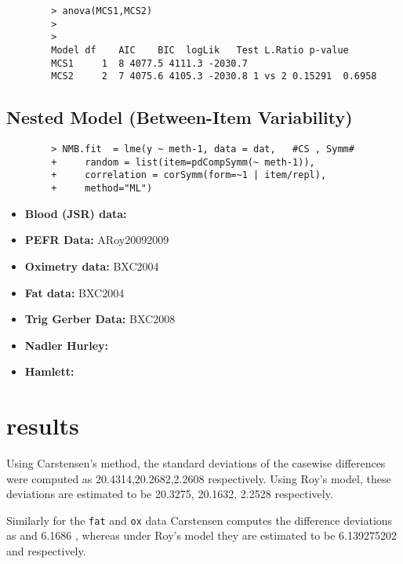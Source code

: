 \documentclass[12pt, a4paper]{report}
\theoremstyle{plain}
\theoremstyle{definition}
\theoremstyle{remark}
\begin{document}
	
	
	\begin{framed}   
		\begin{verbatim}
		> anova(MCS1,MCS2)
		>
		>
		Model df    AIC    BIC  logLik   Test L.Ratio p-value
		MCS1     1  8 4077.5 4111.3 -2030.7
		MCS2     2  7 4075.6 4105.3 -2030.8 1 vs 2 0.15291  0.6958
		\end{verbatim}
	\end{framed}
	
	\subsection{Nested Model (Between-Item Variability)}
	\begin{framed}
		\begin{verbatim}
		> NMB.fit  = lme(y ~ meth-1, data = dat,   #CS , Symm#
		+     random = list(item=pdCompSymm(~ meth-1)),
		+     correlation = corSymm(form=~1 | item/repl), 
		+     method="ML")
		\end{verbatim}
	\end{framed}
	
	
	
	
	\begin{itemize}
		\item \textbf{Blood (JSR) data:} 
		\item \textbf{PEFR Data:} ARoy20092009
		\item \textbf{Oximetry data:} BXC2004
		\item \textbf{Fat data:} BXC2004
		\item \textbf{Trig Gerber Data:} BXC2008
		\item \textbf{Nadler Hurley:}
		\item \textbf{Hamlett:}
	\end{itemize}



	\section{results}
	
	Using Carstensen's method, the standard deviations of the casewise
	differences were computed as 20.4314,20.2682,2.2608
	respectively. Using Roy's model, these deviations are estimated to
	be 20.3275, 20.1632, 2.2528 respectively.
	
	Similarly for the \texttt{fat} and \texttt{ox} data Carstensen computes the
	difference deviations as and 6.1686 , whereas under
	Roy's model they are estimated to be 6.139275202 and
	respectively.
	
\end{document}
